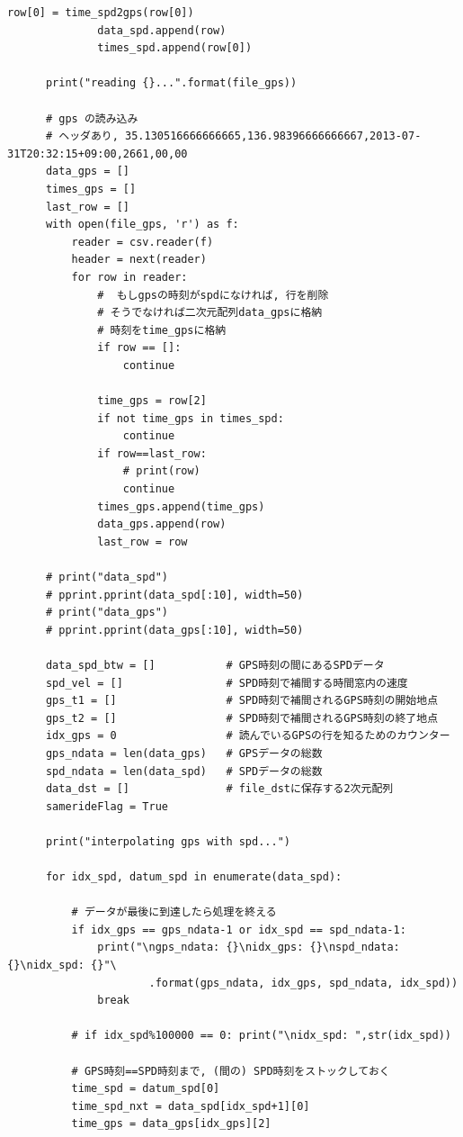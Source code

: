 \documentclass[twocolumn, a4paper, 9pt]{jarticle}
\begin{document}
\begin{lstlisting}[caption=spdgps.py, label=spdgps]
              row[0] = time_spd2gps(row[0])
              data_spd.append(row)
              times_spd.append(row[0])
  
      print("reading {}...".format(file_gps))
  
      # gps の読み込み
      # ヘッダあり, 35.130516666666665,136.98396666666667,2013-07-31T20:32:15+09:00,2661,00,00
      data_gps = []
      times_gps = []
      last_row = []
      with open(file_gps, 'r') as f:
          reader = csv.reader(f)
          header = next(reader)
          for row in reader:
              #  もしgpsの時刻がspdになければ, 行を削除
              # そうでなければ二次元配列data_gpsに格納
              # 時刻をtime_gpsに格納
              if row == []:
                  continue
  
              time_gps = row[2]
              if not time_gps in times_spd:
                  continue
              if row==last_row:
                  # print(row)
                  continue
              times_gps.append(time_gps)
              data_gps.append(row)
              last_row = row
  
      # print("data_spd")
      # pprint.pprint(data_spd[:10], width=50)
      # print("data_gps")
      # pprint.pprint(data_gps[:10], width=50)
  
      data_spd_btw = []           # GPS時刻の間にあるSPDデータ
      spd_vel = []                # SPD時刻で補間する時間窓内の速度
      gps_t1 = []                 # SPD時刻で補間されるGPS時刻の開始地点
      gps_t2 = []                 # SPD時刻で補間されるGPS時刻の終了地点
      idx_gps = 0                 # 読んでいるGPSの行を知るためのカウンター
      gps_ndata = len(data_gps)   # GPSデータの総数
      spd_ndata = len(data_spd)   # SPDデータの総数
      data_dst = []               # file_dstに保存する2次元配列
      samerideFlag = True
  
      print("interpolating gps with spd...")
  
      for idx_spd, datum_spd in enumerate(data_spd):
  
          # データが最後に到達したら処理を終える
          if idx_gps == gps_ndata-1 or idx_spd == spd_ndata-1:
              print("\ngps_ndata: {}\nidx_gps: {}\nspd_ndata: {}\nidx_spd: {}"\
                      .format(gps_ndata, idx_gps, spd_ndata, idx_spd))
              break
  
          # if idx_spd%100000 == 0: print("\nidx_spd: ",str(idx_spd))
  
          # GPS時刻==SPD時刻まで, (間の) SPD時刻をストックしておく
          time_spd = datum_spd[0]
          time_spd_nxt = data_spd[idx_spd+1][0]
          time_gps = data_gps[idx_gps][2]
  

\end{lstlisting}
\end{document}
